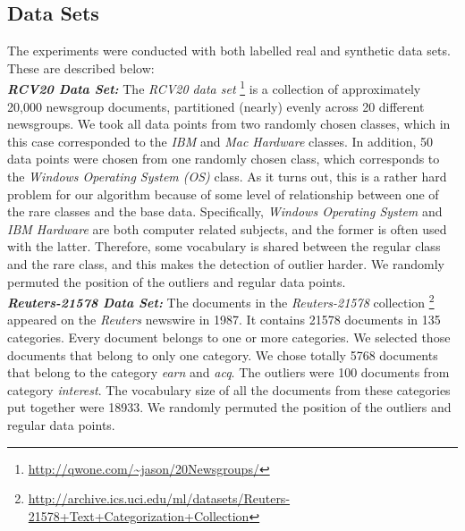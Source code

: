 \subsection{Data Sets}
The experiments were  conducted with both labelled real  and
synthetic data sets.  These are described below:\\
{\bf\em RCV20 Data Set:}  The {\em RCV20 data set}
\footnote{\url{http://qwone.com/~jason/20Newsgroups/}}
 is a collection of approximately 20,000
newsgroup documents, partitioned (nearly) evenly across 20 different
newsgroups. We took all data points from two randomly chosen
classes, which in this case corresponded to the {\em IBM} and {\em
Mac Hardware} classes. In addition, 50 data points were chosen from
one randomly chosen class, which corresponds to the {\em Windows
Operating System (OS)} class. As it turns out, this is a rather hard
problem for  our algorithm because of some level of relationship
between one of the rare classes and the base data. Specifically,
{\em Windows Operating System} and {\em IBM Hardware} are both
computer related subjects, and the former is often used with the
latter. Therefore, some vocabulary is shared between the regular
class and the rare class, and this makes the detection of outlier
harder. We randomly permuted the position of the outliers and
regular data points. \\
{\bf\em Reuters-21578 Data Set:}  The documents in the {\em
Reuters-21578} collection
\footnote{\url{http://archive.ics.uci.edu/ml/datasets/Reuters-21578+Text+Categorization+Collection}}
 appeared on the {\em Reuters} newswire in 1987. It contains  21578 documents in 135
categories. Every document belongs to one or  more categories.
We selected those documents that belong to only one category.
We chose totally 5768 documents that belong to the category {\em earn} and {\em acq}.
The outliers were 100 documents from category {\em interest}. The vocabulary size
of all the documents from these categories put together were 18933.
We randomly permuted the position of the outliers and
regular data points.
\\
